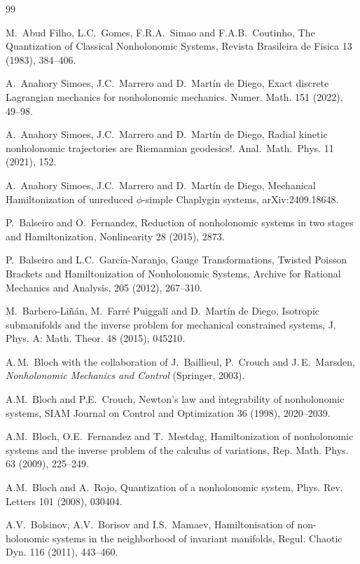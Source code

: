 \documentclass[11pt]{article}
\begin{document}
\begin{thebibliography}{99}

 M.\ Abud Filho, L.C.\ Gomes, F.R.A.\ Simao and
F.A.B.\ Coutinho, The Quantization of Classical Nonholonomic Systems, Revista Brasileira de Fisica 13
(1983), 384--406.

 A.\ Anahory Simoes, J.C.\ Marrero and D.\ Mart\'in de Diego, Exact discrete Lagrangian mechanics for nonholonomic mechanics. Numer. Math. 151 (2022), 49--98.


 A.\ Anahory Simoes, J.C.\ Marrero and D.\ Mart\'in de Diego, Radial kinetic nonholonomic trajectories are Riemannian geodesics!.  Anal.\ Math.\ Phys. 11 (2021), 152.

  A.\ Anahory Simoes, J.C.\ Marrero and D.\ Mart\'in de Diego,  Mechanical Hamiltonization of unreduced $\phi$-simple
Chaplygin systems, arXiv:2409.18648. 

 P.\ Balseiro and O.\ Fernandez, Reduction of nonholonomic systems in two stages and Hamiltonization,  Nonlinearity 28 (2015), 2873.

  P.\ Balseiro and L.C.\ Garc\'ia-Naranjo, Gauge Transformations, Twisted Poisson Brackets and Hamiltonization of Nonholonomic Systems, Archive for Rational Mechanics and Analysis, 205 (2012), 267--310.


 M.\ Barbero-Li\~n\'an, M.\ Farr\'e Puiggal\'i and D.\ Mart\'in de Diego,  Isotropic submanifolds and the inverse problem for mechanical constrained systems,  J. Phys. A: Math. Theor. 48 (2015), 045210.


A.\,M.\ Bloch with the collaboration of J.\ Baillieul,
P.\ Crouch and J.\,E.\ Marsden, {\em Nonholonomic Mechanics and
Control\/} (Springer, 2003).


 A.M.\ Bloch and P.E.\ Crouch, Newton's law and integrability of nonholonomic systems, SIAM Journal on Control and Optimization 36 (1998), 2020--2039.

  A.M.\ Bloch, O.E.\ Fernandez and T.\ Mestdag, Hamiltonization of nonholonomic
systems and the inverse problem of the calculus of variations, Rep. Math. Phys. 63
(2009), 225--249.


 A.M.\ Bloch and A.\ Rojo, Quantization of a nonholonomic system, Phys. Rev. Letters 101
(2008), 030404.

 A.V.\ Bolsinov, A.V.\ Borisov and I.S.\ Mamaev,  Hamiltonisation of non-holonomic systems in the neighborhood of invariant manifolds, Regul. Chaotic Dyn. 116 (2011), 443--460.



\end{thebibliography}
\end{document}
